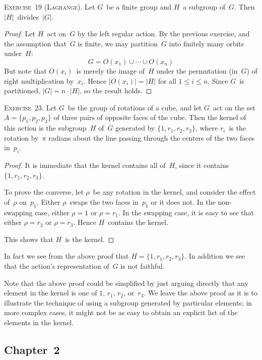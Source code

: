 \documentclass[letterpaper]{article}
\newcommand{\exercise}[1]{\goodbreak\noindent\textsc{Exercise~{#1}.}}
\newcommand{\union}{\cup}
\newcommand{\ord}[1]{|{#1}|}
\begin{document}
\bigskip
\exercise{19 (Lagrange)}
Let $G$~be a finite group and $H$~a subgroup of~$G$. Then $\ord{H}$~divides~$\ord{G}$.
\begin{proof}
Let $H$~act on~$G$ by the left regular action. By the previous exercise, and the assumption that~$G$ is finite, we may partition~$G$ into finitely many orbits under~$H$:
$$G=O(x_1)\union\cdots\union O(x_n)$$
But note that $O(x_i)$~is merely the image of~$H$ under the permutation (in~$G$) of right multiplication by~$x_i$. Hence $\ord{O(x_i)}=\ord{H}$ for all $1\le i\le n$. Since $G$~is partitioned, $\ord{G}=n\cdot\ord{H}$, so the result holds.
\end{proof}

\exercise{23}
Let $G$~be the group of rotations of a cube, and let $G$~act on the set $A=\{p_1,p_2,p_3\}$ of three pairs of opposite faces of the cube. Then the kernel of this action is the subgroup~$H$ of~$G$ generated by $\{1,r_1,r_2,r_3\}$, where $r_i$~is the rotation by~$\pi$ radians about the line passing through the centers of the two faces in~$p_i$.
\begin{proof}
It is immediate that the kernel contains all of~$H$, since it contains $\{1,r_1,r_2,r_3\}$.

To prove the converse, let $\rho$~be any rotation in the kernel, and consider the effect of~$\rho$ on~$p_1$. Either $\rho$~swaps the two faces in~$p_1$ or it does not. In the non-swapping case, either $\rho=1$ or $\rho=r_1$. In the swapping case, it is easy to see that either $\rho=r_2$ or $\rho=r_3$. Hence $H$~contains the kernel.

This shows that $H$~is the kernel.
\end{proof}
\noindent In fact we see from the above proof that $H=\{1,r_1,r_2,r_3\}$. In addition we see that the action's representation of~$G$ is not faithful.

Note that the above proof could be simplified by just arguing directly that any element in the kernel is one of $1$, $r_1$, $r_2$, or~$r_3$. We leave the above proof as it is to illustrate the technique of using a subgroup generated by particular elements; in more complex cases, it might not be as easy to obtain an explicit list of the elements in the kernel.

\subsection*{Chapter~2}
\end{document}
